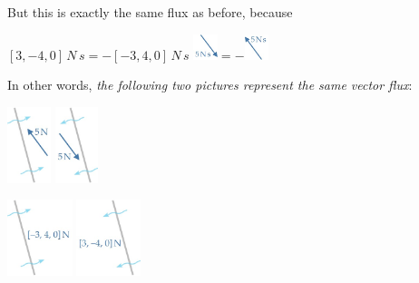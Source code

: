 \documentclass[a4paper,12pt,%
onecolumn,oneside,%
british%
]{memoir}
\renewcommand*{\|}[1][]{\nonscript\:#1\vert\nonscript\:\mathopen{}}
\begin{document}
But this is exactly the same flux as before, because\noprelistbreak
\begin{center}
  \medskip
  $[3, -4, 0]\,\unit{N\,s} = - [-3, 4, 0]\,\unit{N\,s}$
  \qquad\qquad
  \includegraphics[align=c,height=2em]{images/inv_mflux_NW_vec_alone.jpg}${}= -{}$\includegraphics[align=c,height=2em]{images/mflux_NW_vec_alone.jpg}
\end{center}
In other words, \emph{the following two pictures represent the same vector flux}:\noprelistbreak
\begin{center}\label{fig:vector_fluxes}
  \bigskip
\hspace*{\fill}\includegraphics[align=c,height=6em]{images/mflux_NW_vec.jpg}
\qquad
\includegraphics[align=c,height=6em]{images/inv_mflux_NW_vec.jpg}
\hspace*{\fill}

\bigskip

\hspace*{\fill}\includegraphics[align=c,height=6em]{images/mflux_NW.jpg}
\qquad
\includegraphics[align=c,height=6em]{images/inv_mflux_NW.jpg}
\hspace*{\fill}
\end{center}
\end{document}
